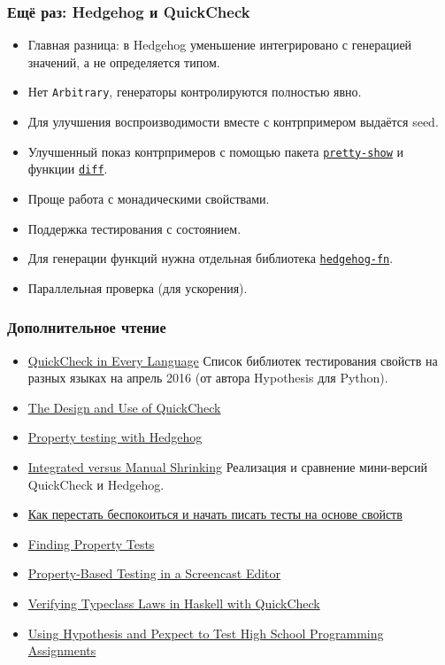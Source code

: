 \documentclass[11pt]{beamer}
\begin{document}
\begin{frame}[fragile]
  \frametitle{Ещё раз: Hedgehog и QuickCheck}
  \begin{itemize}
    \item Главная разница: в Hedgehog уменьшение интегрировано с генерацией значений, а не определяется типом.
    \item Нет \lstinline|Arbitrary|, генераторы контролируются полностью явно.
    \item Для улучшения воспроизводимости вместе с контрпримером выдаётся seed.
    \item Улучшенный показ контрпримеров с помощью пакета \href{https://hackage.haskell.org/package/pretty-show}{\lstinline|pretty-show|} и функции \href{http://hackage.haskell.org/package/hedgehog-1.0/docs/Hedgehog.html#v:diff}{\lstinline|diff|}.
    \item Проще работа с монадическими свойствами.
    \item Поддержка тестирования с состоянием.
    \item Для генерации функций нужна отдельная библиотека \href{https://hackage.haskell.org/package/hedgehog-fn}{\lstinline|hedgehog-fn|}.
    \item Параллельная проверка (для ускорения).
  \end{itemize}
\end{frame}

\begin{frame}[fragile]
  \frametitle{Дополнительное чтение}
  \begin{itemize}
    \item \href{https://hypothesis.works/articles/quickcheck-in-every-language/}{QuickCheck in Every Language} Список библиотек тестирования свойств на разных языках на апрель 2016 (от автора Hypothesis для Python).
    \item \href{https://begriffs.com/posts/2017-01-14-design-use-quickcheck.html}{The Design and Use of QuickCheck}
    \item \href{https://teh.id.au/posts/2017/04/23/property-testing-with-hedgehog/}{Property testing with Hedgehog}
    \item \href{http://www.well-typed.com/blog/2019/05/integrated-shrinking/}{Integrated versus Manual Shrinking} Реализация и сравнение мини-версий QuickCheck и Hedgehog.
    \item \href{https://habr.com/ru/post/434008/}{Как перестать беспокоиться и начать писать тесты на основе свойств}
    \item \href{https://www.hillelwayne.com/post/contract-examples/}{Finding Property Tests}
    \item \href{https://wickstrom.tech/programming/2019/03/02/property-based-testing-in-a-screencast-editor-introduction.html}{Property-Based Testing in a Screencast Editor}
    \item \href{https://austinrochford.com/posts/2014-05-27-quickcheck-laws.html}{Verifying Typeclass Laws in Haskell with QuickCheck}
    \item \href{https://blog.jrheard.com/hypothesis-and-pexpect}{Using Hypothesis and Pexpect to Test High School Programming Assignments}
  \end{itemize}
\end{frame}
\end{document}
